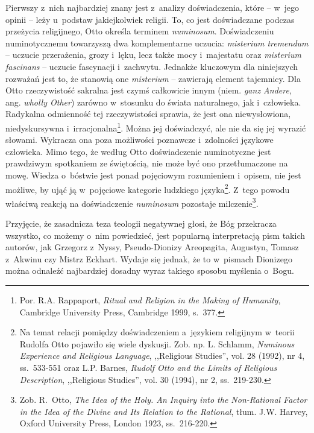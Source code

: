 Pierwszy z~nich najbardziej znany jest z~analizy doświadczenia, które -- w~jego opinii -- leży u~podstaw jakiejkolwiek religii. To, co jest doświadczane podczas przeżycia religijnego, Otto określa terminem \textit{numinosum}. Doświadczeniu numinotycznemu towarzyszą dwa komplementarne uczucia: \textit{misterium tremendum} -- uczucie przerażenia, grozy i~lęku, lecz także mocy i~majestatu oraz \textit{misterium fascinans}\- -- uczucie fascynacji i~zachwytu. Jednakże kluczowym dla niniejszych rozważań jest to, że stanowią one \textit{misterium} -- zawierają element tajemnicy. Dla Otto rzeczywistość sakralna jest czymś całkowicie innym (niem. \textit{ganz Andere}, ang. \textit{wholly Other}) zarówno w~stosunku do świata naturalnego, jak i~człowieka. Radykalna odmienność tej rzeczywistości sprawia, że jest ona niewysłowiona, niedyskursywna i~irracjonalna\footnote{Por. R.A. Rappaport, \textit{Ritual and Religion in the Making of Humanity}, Cambridge University Press, Cambridge 1999, s.~377.}. Można jej doświadczyć, ale nie da się jej wyrazić słowami. Wykracza ona poza możliwości poznawcze i~zdolności językowe człowieka. Mimo tego, że według Otto doświadczenie numinotyczne jest prawdziwym spotkaniem ze świętością, nie może być ono przetłumaczone na mowę. Wiedza o~bóstwie jest ponad pojęciowym rozumieniem i~opisem, nie jest możliwe, by ująć ją w~pojęciowe kategorie ludzkiego języka\footnote{Na temat relacji pomiędzy doświadczeniem a~językiem religijnym w~teorii Rudolfa Otto pojawiło się wiele dyskusji. Zob. np. L. Schlamm, \textit{Numinous Experience and Religious Language}, ,,Religious Studies'', vol. 28 (1992), nr 4, ss.~533-551 oraz L.P. Barnes, \textit{Rudolf Otto and the Limits of Religious Description}, ,,Religious Studies'', vol. 30 (1994), nr 2, ss.~219-230.}. Z~tego powodu właściwą reakcją na doświadczenie \textit{numinosum} pozostaje milczenie\footnote{Zob. R.~Otto, \textit{The Idea of the Holy. An Inquiry into the Non-Rational Factor in the Idea of the Divine and Its Relation to the Rational}, tłum. J.W. Harvey, Oxford University Press, London 1923, ss.~216-220.}.


Przyjęcie, że zasadnicza teza teologii negatywnej głosi, że Bóg przekracza wszystko, co możemy o~nim powiedzieć, jest popularną interpretacją pism takich autorów, jak Grzegorz z~Nyssy, Pseudo-Dionizy Areopagita, Augustyn, Tomasz z~Akwinu czy Mistrz Eckhart. Wydaje się jednak, że to w~pismach Dionizego można odnaleźć najbardziej dosadny wyraz takiego sposobu myślenia o~Bogu.


